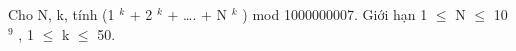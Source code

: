 Cho N, k, tính (1 $^ k $ + 2 $^ k $ + …. + N $^ k $ ) mod 1000000007. Giới hạn 1  $\le$  N  $\le$  10 $^ 9 $ , 1  $\le$  k  $\le$  50.

\